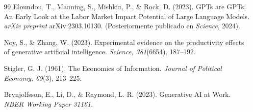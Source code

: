 \documentclass[11pt,a4paper]{article}
\theoremstyle{definition}
\begin{document}
\begin{singlespace}
\begin{thebibliography}{99}
Eloundou, T., Manning, S., Mishkin, P., \& Rock, D. (2023). GPTs are GPTs: An Early Look at the Labor Market Impact Potential of Large Language Models. \textit{arXiv preprint} arXiv:2303.10130. (Posteriormente publicado en \textit{Science}, 2024).

Noy, S., \& Zhang, W. (2023). Experimental evidence on the productivity effects of generative artificial intelligence. \textit{Science, 381}(6654), 187--192.

Stigler, G. J. (1961). The Economics of Information. \textit{Journal of Political Economy, 69}(3), 213--225.

Brynjolfsson, E., Li, D., \& Raymond, L. R. (2023). Generative AI at Work. \textit{NBER Working Paper 31161}.

\end{thebibliography}
\end{singlespace}
\end{document}
